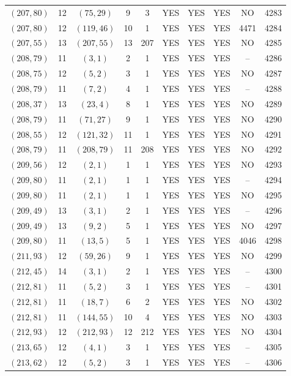 \begin{longtable}{|c|c|c|c|c|c|c|c|c|c|}
$(207, 80)$ & 12 & $(75, 29)$ & 9 & 3 & YES & YES & YES & NO & 4283\\
$(207, 80)$ & 12 & $(119, 46)$ & 10 & 1 & YES & YES & YES & 4471 & 4284\\
$(207, 55)$ & 13 & $(207, 55)$ & 13 & 207 & YES & YES & YES & NO & 4285\\
$(208, 79)$ & 11 & $(3, 1)$ & 2 & 1 & YES & YES & YES & -- & 4286\\
$(208, 75)$ & 12 & $(5, 2)$ & 3 & 1 & YES & YES & YES & NO & 4287\\
$(208, 79)$ & 11 & $(7, 2)$ & 4 & 1 & YES & YES & YES & -- & 4288\\
$(208, 37)$ & 13 & $(23, 4)$ & 8 & 1 & YES & YES & YES & NO & 4289\\
$(208, 79)$ & 11 & $(71, 27)$ & 9 & 1 & YES & YES & YES & NO & 4290\\
$(208, 55)$ & 12 & $(121, 32)$ & 11 & 1 & YES & YES & YES & NO & 4291\\
$(208, 79)$ & 11 & $(208, 79)$ & 11 & 208 & YES & YES & YES & NO & 4292\\
$(209, 56)$ & 12 & $(2, 1)$ & 1 & 1 & YES & YES & YES & NO & 4293\\
$(209, 80)$ & 11 & $(2, 1)$ & 1 & 1 & YES & YES & YES & -- & 4294\\
$(209, 80)$ & 11 & $(2, 1)$ & 1 & 1 & YES & YES & YES & NO & 4295\\
$(209, 49)$ & 13 & $(3, 1)$ & 2 & 1 & YES & YES & YES & -- & 4296\\
$(209, 49)$ & 13 & $(9, 2)$ & 5 & 1 & YES & YES & YES & NO & 4297\\
$(209, 80)$ & 11 & $(13, 5)$ & 5 & 1 & YES & YES & YES & 4046 & 4298\\
$(211, 93)$ & 12 & $(59, 26)$ & 9 & 1 & YES & YES & YES & NO & 4299\\
$(212, 45)$ & 14 & $(3, 1)$ & 2 & 1 & YES & YES & YES & -- & 4300\\
$(212, 81)$ & 11 & $(5, 2)$ & 3 & 1 & YES & YES & YES & -- & 4301\\
$(212, 81)$ & 11 & $(18, 7)$ & 6 & 2 & YES & YES & YES & NO & 4302\\
$(212, 81)$ & 11 & $(144, 55)$ & 10 & 4 & YES & YES & YES & NO & 4303\\
$(212, 93)$ & 12 & $(212, 93)$ & 12 & 212 & YES & YES & YES & NO & 4304\\
$(213, 65)$ & 12 & $(4, 1)$ & 3 & 1 & YES & YES & YES & -- & 4305\\
$(213, 62)$ & 12 & $(5, 2)$ & 3 & 1 & YES & YES & YES & -- & 4306\\

\end{longtable}
